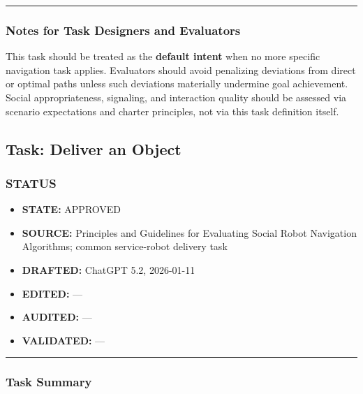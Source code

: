 \documentclass[utf8]{frontiers_suppmat} %
\providecommand{\tightlist}{%
  \setlength{\itemsep}{0pt}\setlength{\parskip}{0pt}}
\begin{document}
\begin{center}\rule{0.5\linewidth}{0.5pt}\end{center}

\subsubsection{Notes for Task Designers and
Evaluators}\label{notes-for-task-designers-and-evaluators}

This task should be treated as the \textbf{default intent} when no more
specific navigation task applies. Evaluators should avoid penalizing
deviations from direct or optimal paths unless such deviations
materially undermine goal achievement. Social appropriateness,
signaling, and interaction quality should be assessed via scenario
expectations and charter principles, not via this task definition
itself.


\subsection{Task: Deliver an Object}\label{task-deliver-an-object}

\subsubsection{STATUS}\label{status}

\begin{itemize}
\tightlist
\item
  \textbf{STATE:} APPROVED\\
\item
  \textbf{SOURCE:} Principles and Guidelines for Evaluating Social Robot
  Navigation Algorithms; common service-robot delivery task\\
\item
  \textbf{DRAFTED:} ChatGPT 5.2, 2026-01-11\\
\item
  \textbf{EDITED:} ---\\
\item
  \textbf{AUDITED:} ---\\
\item
  \textbf{VALIDATED:} ---
\end{itemize}

\begin{center}\rule{0.5\linewidth}{0.5pt}\end{center}

\subsubsection{Task Summary}\label{task-summary}
\end{document}
